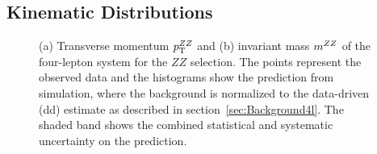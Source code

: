\subsection{Kinematic Distributions}

\begin{figure}[htbp]
\begin{center}
\caption{\label{fig:kindists_zz}(a) Transverse momentum $p_{\mathrm{T}}^{ZZ}$ and (b) invariant mass $m^{ZZ}$ of the 
           four-lepton system for the $ZZ$ selection. The points represent the observed data and the 
           histograms show the prediction from simulation, where the background
           is normalized to the data-driven (dd) estimate as described in section~\ref{sec:Background4l}. The shaded band 
           shows the combined statistical and systematic uncertainty on the prediction. 
}
\end{center}
\end{figure}

